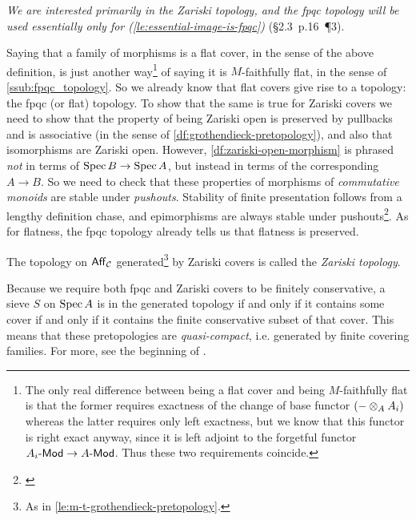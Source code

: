         \emph{We are interested primarily in the Zariski topology, and the fpqc topology will be used essentially only for \elide(\cref{le:essential-image-is-fpqc})} (\S2.3~p.16~\P3).

        \bigskip

        Saying that a family of morphisms is a flat cover, in the sense of the above definition, is just another way\footnote{
            The only real difference between being a flat cover and being $M$-faithfully flat is that the former requires exactness of the change of base functor $({-}\otimes_A A_i)$ whereas the latter requires only left exactness, but we know that this functor is right exact anyway, since it is left adjoint to the forgetful functor ${{A_i}\hbox{-}\mathsf{Mod}}\to{{A}\hbox{-}\mathsf{Mod}}$.
            Thus these two requirements coincide.
        } of saying it is $M$-faithfully flat, in the sense of \cref{ssub:fpqc_topology}.
        So we already know that flat covers give rise to a topology: the fpqc (or flat) topology.
        To show that the same is true for Zariski covers we need to show that the property of being Zariski open is preserved by pullbacks and is associative (in the sense of \cref{df:grothendieck-pretopology}), and also that isomorphisms are Zariski open.
        However, \cref{df:zariski-open-morphism} is phrased \emph{not} in terms of $\operatorname{Spec} B\to\operatorname{Spec} A$, but instead in terms of the corresponding \mbox{$A\to B$}.
        So we need to check that these properties of morphisms of \emph{commutative monoids} are stable under \emph{pushouts}.
        Stability of finite presentation follows from a lengthy definition chase, and epimorphisms are always stable under pushouts\footnote{
             \cite[Proposition~2.5.3(1)]{Borceux:1994ws}
        }.
        As for flatness, the fpqc topology already tells us that flatness is preserved.

        \begin{definition}
            The topology on $\mathsf{Aff}_{\mathcal{C}}$ generated\footnote{
                As in \cref{le:m-t-grothendieck-pretopology}.
            } by Zariski covers is called the \emph{Zariski topology}.
        \end{definition}

        \begin{note}
            Because we require both fpqc and Zariski covers to be finitely conservative, a sieve $S$ on $\operatorname{Spec} A$ is in the generated topology if and only if it contains some cover if and only if it contains the finite conservative subset of that cover.
            This means that these pretopologies are \emph{quasi-compact}, i.e. generated by finite covering families.
            For more, see the beginning of \cite[\S~IX.11]{MacLane:1992uz}.
        \end{note}
        
